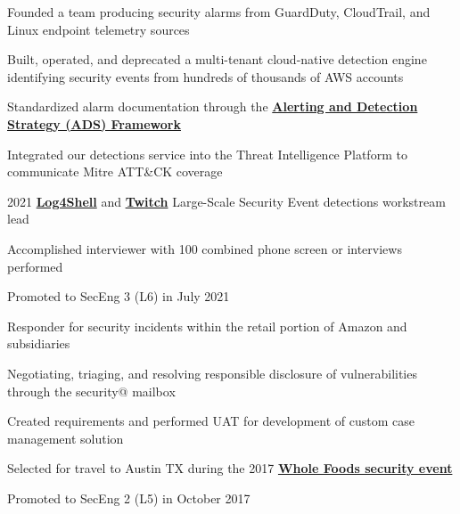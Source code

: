 \documentclass[letterpaper]{deedy-resume} %
\begin{document}
\begin{minipage}[t]{0.66\textwidth}
\begin{tightitemize}
\item Founded a team producing security alarms from GuardDuty, CloudTrail, and Linux endpoint telemetry sources
\item Built, operated, and deprecated a multi-tenant cloud-native detection engine identifying security events from hundreds of thousands of AWS accounts
\item Standardized alarm documentation through the \textbf{\href{https://blog.palantir.com/alerting-and-detection-strategy-framework-52dc33722df2}{Alerting and Detection Strategy (ADS) Framework}}
\item Integrated our detections service into the Threat Intelligence Platform to communicate Mitre ATT\&CK coverage
\item 2021 \textbf{\href{https://en.wikipedia.org/wiki/Log4Shell}{Log4Shell}} and \textbf{\href{https://www.wired.com/story/devastating-twitch-hack-sends-streamers-reeling/}{Twitch}} Large-Scale Security Event detections workstream lead
\item Accomplished interviewer with 100 combined phone screen or interviews performed
\item Promoted to SecEng 3 (L6) in July 2021
\end{tightitemize}

\sectionspace %



\begin{tightitemize}
\item Responder for security incidents within the retail portion of Amazon and subsidiaries
\item Negotiating, triaging, and resolving responsible disclosure of vulnerabilities through the security@ mailbox
\item Created requirements and performed UAT for development of custom case management solution
\item Selected for travel to Austin TX during the 2017 \textbf{\href{https://www.washingtonpost.com/local/whole-foods-reports-customer-credit-card-breach-at-58-locations/2017/10/04/594a056e-a884-11e7-94ce-4f901ed36a82_story.html}{Whole Foods security event}}
\item Promoted to SecEng 2 (L5) in October 2017
\end{tightitemize}


\end{minipage}
\end{document}
